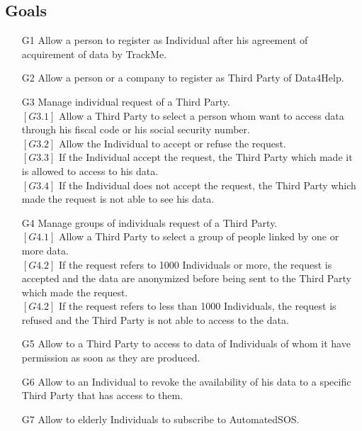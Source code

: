 \documentclass{report}
\begin{document}
			\subsection{Goals}
				\begin{itemize}
					\item[G1] Allow a person to register as Individual after his agreement of acquirement of data by TrackMe.
				
					\item[G2] Allow a person or a company to register as Third Party of Data4Help.

					\item[G3] Manage individual request of a Third Party.\\
					$\left[G3.1\right]$ Allow a Third Party to select a person whom want to access data through his fiscal code or his social security number.\\
					$\left[G3.2\right]$ Allow the Individual to accept or refuse the request.\\
					$\left[G3.3\right]$ If the Individual accept the request, the Third Party which made it is allowed to access to his data.\\
					$\left[G3.4\right]$ If the Individual does not accept the request, the Third Party which made the request is not able to see his data.
				
					\item[G4] Manage groups of individuals request of a Third Party.\\
					$\left[G4.1\right]$ Allow a Third Party to select a group of people linked by one or more data.\\
					$\left[G4.2\right]$ If the request refers to 1000 Individuals or more, the request is accepted and the data are anonymized before being sent to the Third Party which made the request.\\
					$\left[G4.2\right]$ If the request refers to less than 1000 Individuals, the request is refused and the Third Party is not able to access to the data.
				
					\item[G5] Allow to a Third Party to access to data of Individuals of whom it have permission as soon as they are produced.

					\item[G6] Allow to an Individual to revoke the availability of his data to a specific Third Party that has access to them.
					
					\item[G7] Allow to elderly Individuals to subscribe to AutomatedSOS.
					

\end{itemize}
\end{document}
